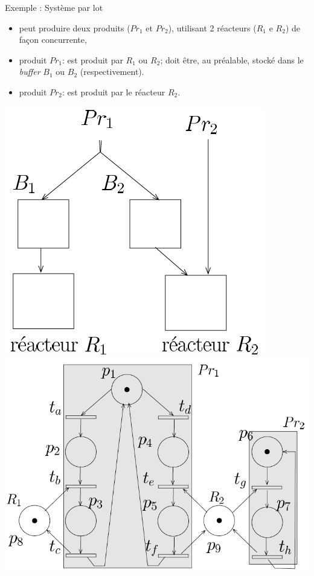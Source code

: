 \documentclass[compress]{beamer}
\begin{document}
\begin{frame}{Exemple : Système par lot}
\begin{itemize}
\item peut produire deux produits ($Pr_1$ et $Pr_2$), utilisant 2 réacteurs
($R_1$ e $R_2$) de fa\c{c}on concurrente,
\item produit $Pr_1$: est produit par $R_1$ ou $R_2$; doit être, au préalable,
stocké dans le {\it buffer} $B_1$ ou $B_2$ (respectivement).
\item produit $Pr_2$: est produit par le réacteur $R_2$.
\end{itemize}
\begin{center}
\includegraphics[width=.2\linewidth]{reacteur}
\hspace{.1\linewidth}
\includegraphics[width=.4\linewidth]{freator}
\end{center}
\end{frame}
 
\end{document}

